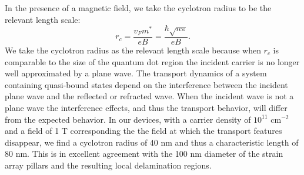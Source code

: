\documentclass[edeposit,fullpage,draftthesis]{uiucthesis2009}
\begin{document}
            In the presence of a magnetic field, we take the cyclotron radius to be the relevant length scale:
            \begin{equation}
                r_c = \frac{v_F m^*}{e B} = \frac{\hbar \sqrt{n \pi}}{e B}.
            \end{equation}
            We take the cyclotron radius as the relevant length scale because 
            when $r_c$ is comparable to the size of the quantum dot region the incident carrier
            is no longer well approximated by a plane wave. The transport dynamics
            of a system containing quasi-bound states depend on the interference between the incident
            plane wave and the reflected or refracted wave. When the incident wave is not a plane wave the
            interference effects, and thus the transport behavior, will differ from the expected behavior.
            In our devices, with a carrier density of $10^{11}$ cm$^{-2}$ and a field of 1 T corresponding the the field 
            at which the transport features disappear,
            we find a cyclotron radius of 40 nm and thus a characteristic length of 80 nm.
            This is in excellent agreement with the 100 nm diameter of the strain array pillars
            and the resulting local delamination regions.
            
\end{document}
